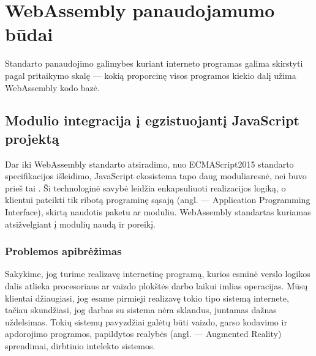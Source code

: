 \documentclass{VUMIFPSkursinis}
\begin{document}
\section{WebAssembly panaudojamumo būdai}
Standarto panaudojimo galimybes kuriant interneto programas galima skirstyti pagal pritaikymo skalę — kokią proporcinę visos programos kiekio dalį užima WebAssembly kodo bazė.

\subsection{Modulio integracija į egzistuojantį JavaScript projektą}
Dar iki WebAssembly standarto atsiradimo, nuo ECMAScript2015 standarto specifikacijos išleidimo, JavaScript ekosistema tapo daug moduliaresnė, nei buvo prieš tai \cite{Cla17}. Ši technologinė savybė leidžia enkapsuliuoti realizacijos logiką, o klientui pateikti tik ribotą programinę sąsają (angl. — Application Programming Interface), skirtą naudotis paketu ar moduliu. WebAssembly standartas kuriamas atsižvelgiant į modulių naudą ir poreikį.

\subsubsection{Problemos apibrėžimas}
Sakykime, jog turime realizavę internetinę programą, kurios esminė verslo logikos dalis atlieka procesoriaus ar vaizdo plokštės darbo laikui imlias operacijas. Mūsų klientai džiaugiasi, jog esame pirmieji realizavę tokio tipo sistemą internete, tačiau skundžiasi, jog darbas su sistema nėra sklandus, juntamas dažnas uždelsimas. Tokių sistemų pavyzdžiai galėtų būti vaizdo, garso kodavimo ir apdorojimo programos, papildytos realybės (angl. — Augmented Reality) sprendimai, dirbtinio intelekto sistemos. 
\end{document}
